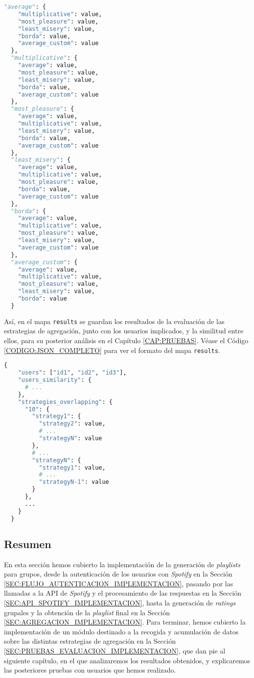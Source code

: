 \begin{lstlisting}[language=python, caption=Diccionario de similitud entre estrategias para una duración, label=CODIGO:SIMILITUD_ESTRATEGIAS]
  "average": {
    "multiplicative": value,
    "most_pleasure": value,
    "least_misery": value,
    "borda": value,
    "average_custom": value
  },
  "multiplicative": {
    "average": value,
    "most_pleasure": value,
    "least_misery": value,
    "borda": value,
    "average_custom": value
  },
  "most_pleasure": {
    "average": value,
    "multiplicative": value,
    "least_misery": value,
    "borda": value,
    "average_custom": value
  },
  "least_misery": {
    "average": value,
    "multiplicative": value,
    "most_pleasure": value,
    "borda": value,
    "average_custom": value
  },
  "borda": {
    "average": value,
    "multiplicative": value,
    "most_pleasure": value,
    "least_misery": value,
    "average_custom": value
  },
  "average_custom": {
    "average": value,
    "multiplicative": value,
    "most_pleasure": value,
    "least_misery": value,
    "borda": value
  }
\end{lstlisting}

Así, en el mapa \texttt{results} se guardan los resultados de la evaluación de las estrategias de agregación, junto con los usuarios 
implicados, y la similitud entre ellos, para su posterior análisis en el Capítulo \ref{CAP:PRUEBAS}. Véase el Código \ref{CODIGO:JSON_COMPLETO}
para ver el formato del mapa \texttt{results}.

\begin{lstlisting}[language=python, caption=Formato del mapa \texttt{results}, label=CODIGO:JSON_COMPLETO]
  {
    "users": ["id1", "id2", "id3"],
    "users_similarity": {
      # ...
    },
    "strategies_overlapping": {
      "10": {
        "strategy1": {
          "strategy2": value, 
          # ...
          "strategyN": value
        },
        # ...
        "strategyN": {
          "strategy1": value, 
          # ...
          "strategyN-1": value
        }
      },
      ...
    }
  }
\end{lstlisting}

\subsection{Resumen}

En esta sección hemos cubierto la implementación de la generación de \textit{playlists} para grupos, desde la autenticación de los usuarios
con \textit{Spotify} en la Sección \ref{SEC:FLUJO_AUTENTICACION_IMPLEMENTACION}, pasando por las llamadas a la API de \textit{Spotify} y el procesamiento de las respuestas
en la Sección \ref{SEC:API_SPOTIFY_IMPLEMENTACION}, hasta la generación de \textit{ratings} grupales y la obtención de la \textit{playlist} final en la Sección \ref{SEC:AGREGACION_IMPLEMENTACION}.
Para terminar, hemos cubierto la implementación de un módulo destinado a la recogida y acumulación de datos sobre las distintas estrategias de agregación en la 
Sección \ref{SEC:PRUEBAS_EVALUACION_IMPLEMENTACION}, que dan pie al siguiente capítulo, en el que analizaremos los resultados obtenidos, y explicaremos las posteriores
pruebas con usuarios que hemos realizado.